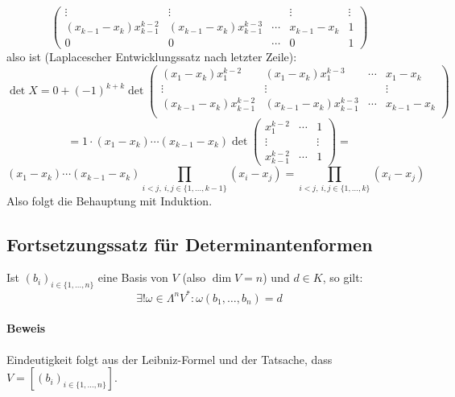 \begin{Definition}
\[\begin{pmatrix}
			\vdots & \vdots &  & \vdots & \vdots \\ 
			(x_{k-1}-x_k)x_{k-1}^{k-2}& (x_{k-1}-x_k)x_{k-1}^{k-3} & \cdots & x_{k-1}-x_k & 1 \\ 
			0 & 0 & \cdots & 0 & 1
			\end{pmatrix}  \]
		also ist (Laplacescher Entwicklungssatz nach letzter Zeile):
			\[ \det X = 0+(-1)^{k+k}\det 
				\begin{pmatrix}
					(x_1-x_k)x_1^{k-2} & (x_1-x_k)x_1^{k-3} & \cdots & x_1-x_k \\ 
					\vdots & \vdots &  & \vdots  \\ 
					(x_{k-1}-x_k)x_{k-1}^{k-2}& (x_{k-1}-x_k)x_{k-1}^{k-3} & \cdots & x_{k-1}-x_k  \\ 
				\end{pmatrix} \]
			\[ = 1\cdot(x_1-x_k)\cdots (x_{k-1}-x_k)\det
				\begin{pmatrix}
				x_1^{k-2} & \cdots & 1 \\ 
				\vdots &  & \vdots \\ 
				x_{k-1}^{k-2} & \cdots & 1
				\end{pmatrix} = \]
				\[ (x_1-x_k)\cdots(x_{k-1}-x_k)\prod_{i<j,\ i,j\in\{1,\dots, k-1 \}}(x_i-x_j) = \prod_{i<j,\ i,j\in \{1,\dots,k\}}(x_i-x_j) \]
		Also folgt die Behauptung mit Induktion.
	\end{Definition}
\subsection{Fortsetzungssatz für Determinantenformen}
	\begin{Satz}
		Ist $ (b_i)_{i\in \{1,\dots,n\}} $ eine Basis von $ V $ (also $ \dim V = n $) und $ d\in K $, so gilt:
		\[ \exists! \omega\in\Lambda^nV^*:\omega(b_1,\dots,b_n) = d \]
	\end{Satz}
\paragraph{Beweis}
	Eindeutigkeit folgt aus der Leibniz-Formel und der Tatsache, dass $ V=[(b_i)_{i\in\{1,\dots,n\}}] $.
	
